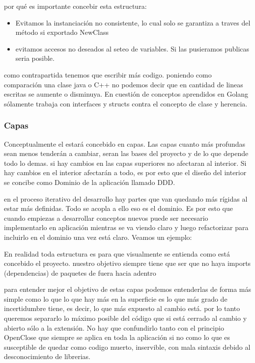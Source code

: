 por qué es importante concebir esta estructura:

\begin{itemize}
    \item Evitamos la instanciación no consistente, lo cual solo se garantiza a traves del método si exportado NewClass
    \item evitamos accesos no deseados al seteo de variables. Si las pusieramos publicas seria posible.
\end{itemize}

como contrapartida tenemos que escribir más codigo. poniendo como comparación una clase java o C++ no podemos decir que en cantidad de lineas escritas se aumente o disminuya. En cuestión de conceptos aprendidos en Golang sólamente trabaja con interfaces y structs contra el concepto de clase y herencia.

\subsubsection{Capas}

Conceptualmente el estará concebido en capas. Las capas cuanto más profundas sean menos tenderán a cambiar, seran las bases del proyecto y de lo que depende todo lo demas. si hay cambios en las capas superiores no afectaran al interior. Si hay cambios en el interior afectarán a todo, es por esto que el diseño del interior se concibe como Dominio de la aplicación llamado DDD.

en el proceso iterativo del desarrollo hay partes que van quedando más rígidas al estar más definidas. Todo se acopla a ello eso es el dominio. Es por esto que cuando empiezas a desarrollar conceptos nuevos puede ser necesario implementarlo en aplicación mientras se va viendo claro y luego refactorizar para incluirlo en el dominio una vez está claro.
Veamos un ejemplo:

\begin{figure}
    
    \caption{}
    \label{fig:ProjectfolderStructure}
\end{figure}

En realidad toda estructura es para que visualmente se entienda como está concebido el proyecto. nuestro objetivo siempre tiene que ser que no haya imports (dependencias) de paquetes de fuera hacia adentro


para entender mejor el objetivo de estas capas podemos entenderlas de forma más simple como lo que lo que hay más en la superficie es lo que más grado de incertidumbre tiene, es decir, lo que más expuesto al cambio está. por lo tanto queremos separarlo lo máximo posible del código que si está cerrado al cambio y abierto sólo a la extensión. No hay que confundirlo tanto con el principio OpenClose que siempre se aplica en toda la aplicación si no como lo que es susceptible de quedar como codigo muerto, inservible, con mala sintaxis debido al desconocimiento de librerias.

